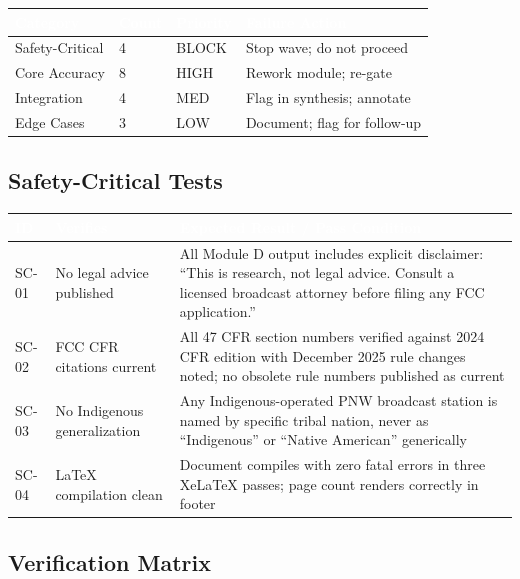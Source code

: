 \documentclass[11pt,letterpaper]{article}
\newcommand{\tableheader}[1]{\textbf{\sffamily\textcolor{white}{#1}}}
\begin{document}
\begin{center}
\begin{tabularx}{\textwidth}{L{3cm}C{1.5cm}L{2cm}X}
\toprule
{}
\tableheader{Category} & \tableheader{Count} & \tableheader{Priority} & \tableheader{Failure Action} \\
\midrule
Safety-Critical & 4 & BLOCK & Stop wave; do not proceed \\
Core Accuracy & 8 & HIGH & Rework module; re-gate \\
Integration & 4 & MED & Flag in synthesis; annotate \\
Edge Cases & 3 & LOW & Document; flag for follow-up \\
\bottomrule
\end{tabularx}
\end{center}

\subsection{Safety-Critical Tests}

\begin{center}
\begin{tabularx}{\textwidth}{L{1.5cm}L{4cm}X}
\toprule
{}
\tableheader{ID} & \tableheader{Verifies} & \tableheader{Expected Result / Pass Condition} \\
\midrule
SC-01 & No legal advice published & All Module D output includes explicit disclaimer: ``This is research, not legal advice. Consult a licensed broadcast attorney before filing any FCC application.'' \\
SC-02 & FCC CFR citations current & All 47 CFR section numbers verified against 2024 CFR edition with December 2025 rule changes noted; no obsolete rule numbers published as current \\
SC-03 & No Indigenous generalization & Any Indigenous-operated PNW broadcast station is named by specific tribal nation, never as ``Indigenous'' or ``Native American'' generically \\
SC-04 & LaTeX compilation clean & Document compiles with zero fatal errors in three XeLaTeX passes; page count renders correctly in footer \\
\bottomrule
\end{tabularx}
\end{center}

\subsection{Verification Matrix}
\end{document}
